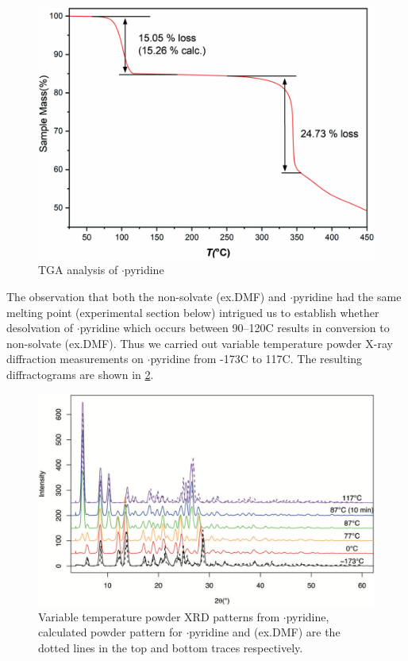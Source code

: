 \begin{refsection}
\begin{figure}
    \centering
    \includegraphics[width=0.8\linewidth]{Figures/tga.pdf}
    \caption{TGA analysis of $\cdot$pyridine}
    \label{fig:tga}
\end{figure}

The observation that both the non-solvate (ex.DMF) and $\cdot$pyridine had the same melting point (experimental section below) intrigued us to establish whether desolvation of $\cdot$pyridine which occurs between 90--120\degree C results in conversion to non-solvate (ex.DMF).
Thus we carried out variable temperature powder X-ray diffraction measurements on $\cdot$pyridine from -173\degree C to 117\degree C.
The resulting diffractograms are shown in \cref{fig:vt-pdx}.

\begin{figure}
    \centering
    \includegraphics[width=\linewidth]{Figures/vt-pdx.pdf}
    \caption[Variable temperature powder XRD patterns from $\cdot$pyridine]{Variable temperature powder XRD patterns from $\cdot$pyridine, calculated powder pattern for $\cdot$pyridine and (ex.DMF) are the dotted lines in the top and bottom traces respectively.}
    \label{fig:vt-pdx}
\end{figure}


\end{refsection}
